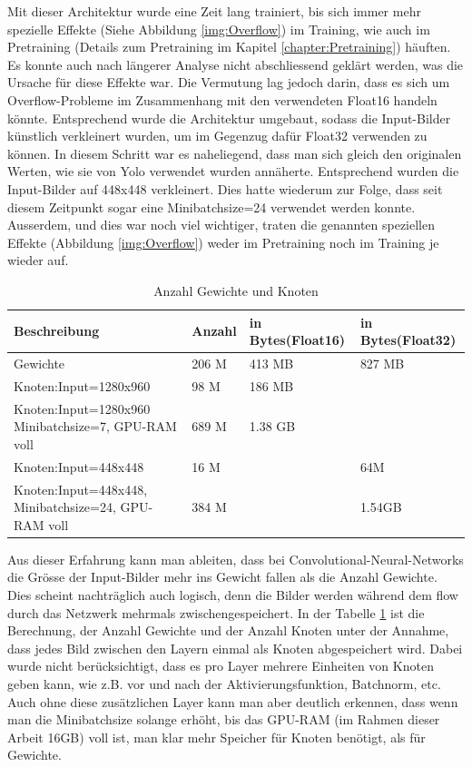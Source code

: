 Mit dieser Architektur wurde eine Zeit lang trainiert, bis sich immer mehr spezielle Effekte (Siehe Abbildung \ref{img:Overflow}) im Training, wie auch im Pretraining (Details zum Pretraining im Kapitel \ref{chapter:Pretraining}) häuften.
Es konnte auch nach längerer Analyse nicht abschliessend geklärt werden, was die Ursache für diese Effekte  war.
Die Vermutung lag jedoch darin, dass es sich um Overflow-Probleme im Zusammenhang mit den verwendeten Float16 handeln könnte.
Entsprechend wurde die Architektur umgebaut, sodass die Input-Bilder künstlich verkleinert wurden, um im Gegenzug dafür Float32 verwenden zu können.
In diesem Schritt war es naheliegend, dass man sich gleich den originalen Werten, wie sie von Yolo \cite{yolo} verwendet wurden annäherte.
Entsprechend wurden die Input-Bilder auf 448x448 verkleinert.
Dies hatte wiederum zur Folge, dass seit diesem Zeitpunkt sogar eine Minibatchsize=24 verwendet werden konnte.
Ausserdem, und dies war noch viel wichtiger, traten die genannten speziellen Effekte (Abbildung \ref{img:Overflow}) weder im Pretraining noch im Training je wieder auf. 

\begin{table}
\centering
\begin{tabularx}{\textwidth}{|X|l|l|l|}
\hline  Beschreibung & Anzahl & in Bytes(Float16) & in Bytes(Float32)\\
\hline  Gewichte											& 206 M 	& 413 MB 	& 827 MB		\\
\hline  Knoten:Input=1280x960 							&  98 M 	& 186 MB 	&			\\
\hline  Knoten:Input=1280x960 Minibatchsize=7, GPU-RAM voll	& 689 M 	& 1.38 GB 	& 			\\
\hline  Knoten:Input=448x448 							&  16 M 	& 			& 64M 		\\
\hline  Knoten:Input=448x448, Minibatchsize=24, GPU-RAM voll	& 384 M 	& 			& 1.54GB 	\\
\hline
\end{tabularx}
\caption{Anzahl Gewichte und Knoten}
\label{tbl:anzahl_gewichte_knoten}
\end{table} 

Aus dieser Erfahrung kann man ableiten, dass bei Convolutional-Neural-Networks die Grösse der Input-Bilder mehr ins Gewicht fallen als die Anzahl Gewichte. 
Dies scheint nachträglich auch logisch, denn die Bilder werden während dem \grqq{}flow\grqq{} durch das Netzwerk mehrmals zwischengespeichert.
In der Tabelle \ref{tbl:anzahl_gewichte_knoten} ist die Berechnung, der Anzahl Gewichte und der Anzahl Knoten unter der Annahme, dass jedes Bild zwischen den Layern einmal als Knoten abgespeichert wird.
Dabei wurde nicht berücksichtigt, dass es pro Layer mehrere Einheiten von Knoten geben kann, wie z.B. vor und nach der Aktivierungsfunktion, Batchnorm, etc. 
Auch ohne diese zusätzlichen Layer kann man aber deutlich erkennen, dass wenn man die Minibatchsize solange erhöht, bis das GPU-RAM (im Rahmen dieser Arbeit 16GB) voll ist, man klar mehr Speicher für Knoten benötigt, als für Gewichte.

